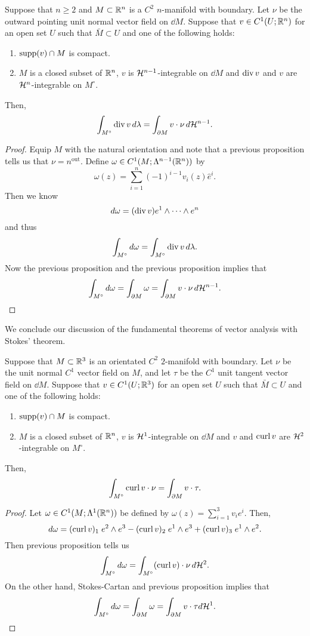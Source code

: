 \documentclass[a4paper]{article}
\begin{document}
\begin{thm}
Suppose that $n \geq 2$ and $M \subset \mathbb{R}^n$ is a $C^2$ 
$n$-manifold with boundary. Let $\nu$ be the outward pointing 
unit normal vector field on $\dd M$. Suppose that 
$v \in C^1(U ; \mathbb{R}^n)$ for an open set $U$ such that 
$\bar{M} \subset U$ and one of the following holds: 
\begin{enumerate}
\item $\operatorname{supp}(v) \cap M$ is compact.
\item $M$ is a closed subset of $\mathbb{R}^n$, $v$ is 
$\mathcal{H}^{n-1}$-integrable on $\dd M$ and $\operatorname{div} v$ and $v$ 
are $\mathcal{H}^n$-integrable on $M^\circ$.
\end{enumerate}
Then, 
\[
\int_{M^\circ} \operatorname{div} v \, d \lambda = \int_{\partial M} 
v \cdot \nu \, d \mathcal{H}^{n-1}.
\]
\end{thm}

\begin{proof}
Equip $M$ with the natural orientation and note that a previous 
proposition tells us that $\nu = n^{\text{out}}$. Define 
$\omega \in C^1 (M ; \Lambda^{n-1} (\mathbb{R}^n))$ by 
\[
\omega(z) = \sum_{i=1}^n (-1)^{i-1} v_i(z) \hat{e}^i.
\]
Then we know 
\[
d \omega = (\operatorname{div} v) e^1 \wedge \dots \wedge e^n
\]
and thus 
\[
\int_{M^\circ} d \omega = \int_{M^\circ} \operatorname{div} 
v \, d \lambda.
\]
Now the previous proposition and the previous proposition
implies that 
\[
\int_{M^\circ} d \omega = \int_{\partial M} \omega
= \int_{\partial M} v \cdot \nu \, d \mathcal{H}^{n-1}.
\]
\end{proof}

We conclude our discussion of the fundamental theorems of 
vector analysis with Stokes' theorem.

\begin{thm}
Suppose that $M \subset \mathbb{R}^3$ is an orientated $C^2$ 
$2$-manifold with boundary. Let $\nu$ be the unit normal 
$C^1$ vector field on $M$, and let $\tau$ be the $C^1$
unit tangent vector field on $\dd M$. Suppose that 
$v \in C^1(U; \mathbb{R}^3)$ for an open set $U$ such that $\bar{M}
\subset U$ and one of the following holds: 
\begin{enumerate}
\item $\operatorname{supp}(v) \cap M$ is compact.
\item $M$ is a closed subset of $\mathbb{R}^n$, $v$ is $\mathcal{H}^1$-integrable
on $\dd M$ and $v$ and $\operatorname{curl} v$ are $\mathcal{H}^2$-integrable
on $M^\circ$.
\end{enumerate} 
Then, 
\[
\int_{M^\circ} \operatorname{curl} v \cdot \nu = \int_{\partial M} v \cdot \tau.
\]
\end{thm}

\begin{proof}
Let $\omega \in C^1(M; \Lambda^1(\mathbb{R}^n))$ be defined by 
$\omega(z) = \sum_{i=1}^3 v_i e^i$. Then, 
\[
d \omega = (\operatorname{curl} v)_1 \; e^2 \wedge e^3 
- (\operatorname{curl} v)_2 \; e^1 \wedge e^3 
+ (\operatorname{curl} v)_3 \; e^1 \wedge e^2.
\]
Then previous proposition tells us
\[
\int_{M^\circ} d \omega 
= \int_{M^\circ} (\operatorname{curl} v) \cdot \nu \, d \mathcal{H}^2.
\]
On the other hand, Stokes-Cartan and previous proposition
implies that 
\[
\int_{M^\circ} d \omega = \int_{\partial M} \omega
= \int_{\partial M} v \cdot \tau d \mathcal{H}^1.
\]
\end{proof}
\end{document}
